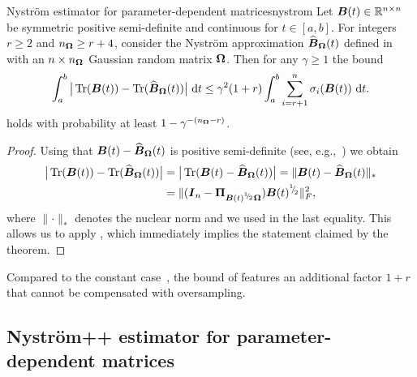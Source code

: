 \begin{theorem}{Nyström estimator for parameter-dependent matrices}{nystrom}
    Let $\boldsymbol{B}(t) \in \mathbb{R}^{n \times n}$ be symmetric positive semi-definite and continuous for $t \in [a, b]$. For integers $r \geq 2$ and $n_{\boldsymbol{\Omega}} \geq r + 4$, consider the Nystr\"om approximation $\widehat{\boldsymbol{B}}_{\boldsymbol{\Omega}}(t)$ defined in~ with an $n\times n_{\boldsymbol{\Omega}}$ Gaussian random matrix $\boldsymbol{\Omega}$. Then for any $\gamma \geq 1$ the bound 
    \[
        \int_{a}^{b} \big| \operatorname{Tr}(\boldsymbol{B}(t)) - \operatorname{Tr}(\widehat{\boldsymbol{B}}_{\boldsymbol{\Omega}}(t)) \big| ~\mathrm{d}t
        \leq \gamma^2 (1 + r) \int_{a}^{b} \sum_{i = r+1}^{n} \sigma_i(\boldsymbol{B}(t)) ~\mathrm{d}t.
    \]
    holds with probability at least $1 - \gamma^{-(n_{\boldsymbol{\Omega}} - r)}$.
\end{theorem}
\begin{proof}
Using that $\boldsymbol{B}(t) - \widehat{\boldsymbol{B}}_{\boldsymbol{\Omega}}(t)$ is positive semi-definite (see, e.g.,~\cite[Lemma 2.1]{frangella-2023-randomized-nystrom}) we obtain
    \begin{align*}
        \big| \operatorname{Tr}(\boldsymbol{B}(t)) - \operatorname{Tr}(\widehat{\boldsymbol{B}}_{\boldsymbol{\Omega}}(t)) \big|
        & = \big| \operatorname{Tr}(\boldsymbol{B}(t) - \widehat{\boldsymbol{B}}_{\boldsymbol{\Omega}}(t)) \big|
        = \lVert \boldsymbol{B}(t) - \widehat{\boldsymbol{B}}_{\boldsymbol{\Omega}}(t) \rVert _{\ast} \\
        & = \lVert (\boldsymbol{I}_n - \boldsymbol{\Pi}_{\boldsymbol{B}(t)^{{}^{1}{\mskip -5mu/\mskip -3mu}_{2}} \boldsymbol{\Omega}}) \boldsymbol{B}(t)^{{}^{1}{\mskip -5mu/\mskip -3mu}_{2}} \rVert _F^2,
    \end{align*}
    where $\lVert \cdot \rVert _{\ast}$ denotes the nuclear norm and we used \cite[Theorem 1]{gittens-2011-spectral-norm} in the last equality. This allows us to apply \cite[Theorem 5]{kressner-2024-randomized-lowrank}, which immediately implies the statement claimed by the theorem.
\end{proof}

Compared to the constant case~\cite[Theorem 8.1]{tropp-2023-randomized-algorithms}, the bound of  features an additional factor $1+r$ that cannot be compensated with oversampling.

\subsection{Nyström++ estimator for parameter-dependent matrices}
\label{subsec:nystrom-pp}


